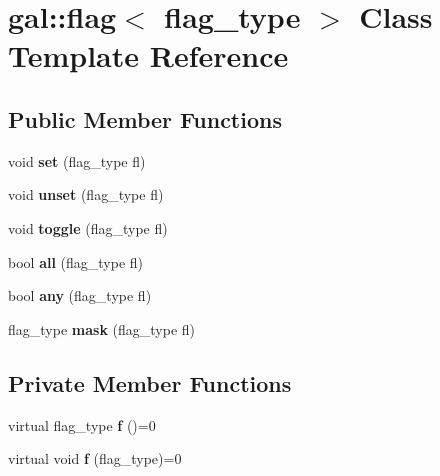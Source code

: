 \hypertarget{classgal_1_1flag}{\section{gal\-:\-:flag$<$ flag\-\_\-type $>$ \-Class \-Template \-Reference}
\label{classgal_1_1flag}
}
\subsection*{\-Public \-Member \-Functions}
\begin{DoxyCompactItemize}
\item 
\hypertarget{classgal_1_1flag_a15547f1ab906e6f2ce8d0f39cfd04176}{void {\bfseries set} (flag\-\_\-type fl)}\label{classgal_1_1flag_a15547f1ab906e6f2ce8d0f39cfd04176}

\item 
\hypertarget{classgal_1_1flag_ad1b12cce504346f9653b3942294bf49a}{void {\bfseries unset} (flag\-\_\-type fl)}\label{classgal_1_1flag_ad1b12cce504346f9653b3942294bf49a}

\item 
\hypertarget{classgal_1_1flag_a0f1b53ccd1537f6e39963fac972fb3ea}{void {\bfseries toggle} (flag\-\_\-type fl)}\label{classgal_1_1flag_a0f1b53ccd1537f6e39963fac972fb3ea}

\item 
\hypertarget{classgal_1_1flag_a4d088d21d36671e9543b841401f5f36e}{bool {\bfseries all} (flag\-\_\-type fl)}\label{classgal_1_1flag_a4d088d21d36671e9543b841401f5f36e}

\item 
\hypertarget{classgal_1_1flag_a22bdaed53c48667a62b81ba1f816b784}{bool {\bfseries any} (flag\-\_\-type fl)}\label{classgal_1_1flag_a22bdaed53c48667a62b81ba1f816b784}

\item 
\hypertarget{classgal_1_1flag_a16bf19c0d8eccbb9aff4ac08cf1f7548}{flag\-\_\-type {\bfseries mask} (flag\-\_\-type fl)}\label{classgal_1_1flag_a16bf19c0d8eccbb9aff4ac08cf1f7548}

\end{DoxyCompactItemize}
\subsection*{\-Private \-Member \-Functions}
\begin{DoxyCompactItemize}
\item 
\hypertarget{classgal_1_1flag_ab9d99be9a66fe9c01092be31f9cf5059}{virtual flag\-\_\-type {\bfseries f} ()=0}\label{classgal_1_1flag_ab9d99be9a66fe9c01092be31f9cf5059}

\item 
\hypertarget{classgal_1_1flag_a33f6c18a860cdb9181ba325c8b9433d7}{virtual void {\bfseries f} (flag\-\_\-type)=0}\label{classgal_1_1flag_a33f6c18a860cdb9181ba325c8b9433d7}

\end{DoxyCompactItemize}
